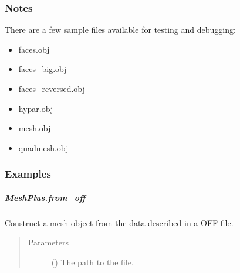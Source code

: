 \documentclass[letterpaper,10pt,english]{sphinxmanual}
\begin{document}
\begin{fulllineitems}
\begin{fulllineitems}
\begin{quote}
\begin{description}
\end{description}\end{quote}
\subsubsection*{Notes}

There are a few sample files available for testing and debugging:
\begin{itemize}
\item {} 
faces.obj

\item {} 
faces\_big.obj

\item {} 
faces\_reversed.obj

\item {} 
hypar.obj

\item {} 
mesh.obj

\item {} 
quadmesh.obj

\end{itemize}
\subsubsection*{Examples}

\begin{sphinxVerbatim}[commandchars=\\\{\}]
\end{sphinxVerbatim}

\end{fulllineitems}



\subparagraph{MeshPlus.from\_off}
\label{\detokenize{api/generated/directional_clustering.mesh.MeshPlus.from_off:meshplus-from-off}}\label{\detokenize{api/generated/directional_clustering.mesh.MeshPlus.from_off::doc}}

\begin{fulllineitems}
\label{\detokenize{api/generated/directional_clustering.mesh.MeshPlus.from_off:directional_clustering.mesh.MeshPlus.from_off}}
Construct a mesh object from the data described in a OFF file.
\begin{quote}\begin{description}
\item[{Parameters}] \leavevmode
{} () \textendash{} The path to the file.


\end{description}
\end{quote}
\end{fulllineitems}
\end{fulllineitems}
\end{document}
